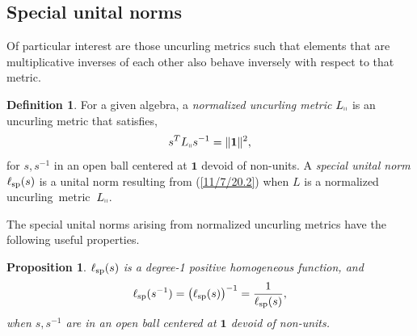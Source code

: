 \documentclass{amsart}
\newtheorem{proposition}[theorem]{Proposition}
\theoremstyle{definition}
\newtheorem{definition}[theorem]{Definition}
\numberwithin{theorem}{section}
\numberwithin{equation}{section}
\begin{document}
\subsection{Special unital norms}
Of particular interest are those uncurling metrics such that elements that are multiplicative inverses of each other also behave inversely with respect to that metric.   
 
    \begin{definition}\label{9/20/23.1} For a given algebra, a {\it normalized uncurling metric} $L_{\shortparallel}$ is an uncurling metric that satisfies, \begin{equation} \label{7/7/21.1} s^TL_{\shortparallel} s^{-1} =\|{\bf 1}\|^2,\end{equation} for $s,s^{-1}$ in an open ball centered at $\mathbf{1}$ devoid of non-units.   A {\it special unital norm} $\ell_{\rm sp}(s)$ is a unital norm resulting from (\ref{11/7/20.2}) when $L$ is a normalized \mbox{uncurling metric $L_{\shortparallel}$}. 
\end{definition}

The special unital norms arising from normalized uncurling metrics have the following useful properties.
  
  \begin{proposition}\label{9/24/23.1} $ \ell_{\rm sp}(s)$ is a degree-1 positive homogeneous function, and
\begin{equation}\label{5/23/23.3}  \ell_{\rm sp}(s^{-1}) = \big(\ell_{\rm sp}(s)\big)^{-1} = \frac{1}{\ell_{\rm sp}(s)}, \end{equation} when $s,s^{-1}$ are in an open ball centered at $\mathbf{1}$ devoid of non-units. \end{proposition}
\end{document}
